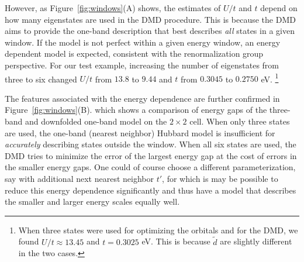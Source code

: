 However, as Figure~\ref{fig:windows}(A) shows, the estimates of $U/t$ and $t$ depend on how many eigenstates 
are used in the DMD procedure. This is because the DMD aims to provide the one-band description 
that best describes \textit{all} states in a given window. If the model is not perfect within a given energy window, 
an energy dependent model is expected, consistent with the renormalization group perspective. For our test example, 
increasing the number of eigenstates from three to six changed $U/t$ from $13.8$ to $9.44$ and $t$ from $0.3045$ to $0.2750$ eV.
\footnote{When three states were used for optimizing the orbitals and for the DMD, we found $U/t\approx 13.45$ and $t=0.3025$ eV. 
This is because $\tilde{d}$ are slightly different in the two cases.} 

The features associated with the energy dependence are further confirmed in Figure~\ref{fig:windows}(B). 
which shows a comparison of energy gaps of the three-band and downfolded one-band model on the $2\times2$ cell. 
When only three states are used, the one-band (nearest neighbor) Hubbard model is insufficient for \textit{accurately}
describing states outside the window. When all six states are used, the DMD tries to minimize the error of the 
largest energy gap at the cost of errors in the smaller energy gaps. 
One could of course choose a different parameterization, say with additional next nearest neighbor $t'$, for which is 
may be possible to reduce this energy dependence significantly and thus have a model that describes the smaller 
and larger energy scales equally well.
 
 
